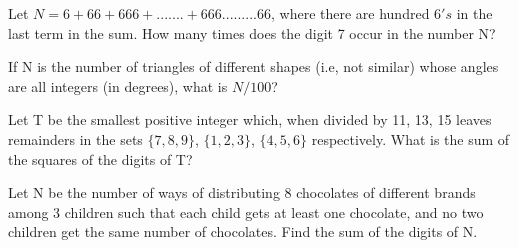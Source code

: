 \item Let $N = 6 + 66 + 666 +.......+ 666.........66$, where there are hundred $6's$ in the last term in the sum. How many times does the digit 7 occur in the number N?

\item If N is the number of triangles of different shapes (i.e, not similar) whose angles are all integers (in degrees), what is $N/100$?

\item Let T be the smallest positive integer which, when divided by 11, 13, 15 leaves remainders in the sets 
$\{7, 8, 9\}$, $\{1, 2, 3\}$, $\{4, 5, 6\}$ respectively. What is the sum of the squares of the digits of T?

\item Let N be the number of ways of distributing 8 chocolates of different brands among 3 children such that each child gets at least one chocolate, and no two children get the same number of chocolates. Find the sum of the digits of N.
